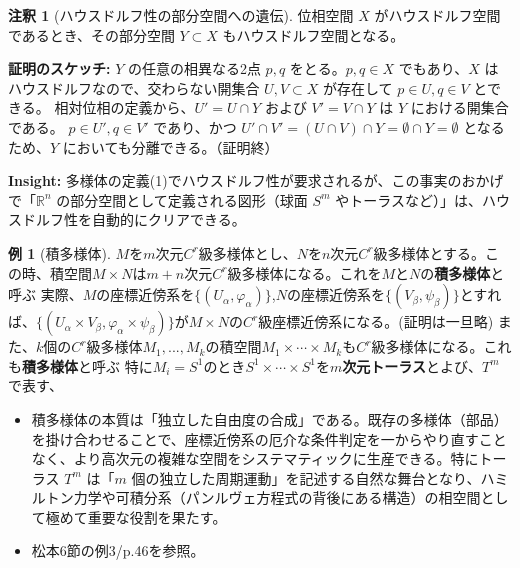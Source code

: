 \documentclass[paper=a4, fontsize=11pt]{jlreq} %
\theoremstyle{definition}
\newtheorem{example}[theorem]{例}
\newtheorem{remark}[theorem]{注釈}
\begin{document}
\begin{remark}[ハウスドルフ性の部分空間への遺伝]
    位相空間 $X$ がハウスドルフ空間であるとき、その部分空間 $Y \subset X$ もハウスドルフ空間となる。
    
    \textbf{証明のスケッチ:}
    $Y$ の任意の相異なる2点 $p, q$ をとる。$p, q \in X$ でもあり、$X$ はハウスドルフなので、交わらない開集合 $U, V \subset X$ が存在して $p \in U, q \in V$ とできる。
    相対位相の定義から、$U' = U \cap Y$ および $V' = V \cap Y$ は $Y$ における開集合である。
    $p \in U', q \in V'$ であり、かつ $U' \cap V' = (U \cap V) \cap Y = \emptyset \cap Y = \emptyset$ となるため、$Y$ においても分離できる。（証明終）
    
    \textbf{Insight:} 多様体の定義(1)でハウスドルフ性が要求されるが、この事実のおかげで「$\mathbb{R}^n$ の部分空間として定義される図形（球面 $S^m$ やトーラスなど）」は、ハウスドルフ性を自動的にクリアできる。
\end{remark}

\begin{example}[積多様体]
    $M$を$m$次元$C^{r}$級多様体とし、$N$を$n$次元$C^{r}$級多様体とする。この時、積空間$M\times N$は$m+n$次元$C^{r}$級多様体になる。これを$M$と$N$の\textbf{積多様体}と呼ぶ
    実際、$M$の座標近傍系を$\{(U_{\alpha},\varphi_{\alpha})\}$,$N$の座標近傍系を$\{(V_{\beta},\psi_{\beta})\}$とすれば、$\{(U_{\alpha}\times V_{\beta},\varphi_{\alpha}\times\psi_{\beta})\}$が$M\times N$の$C^{r}$級座標近傍系になる。(証明は一旦略)
    また、$k$個の$C^{r}$級多様体$M_{1},...,M_{k}$の積空間$M_{1}\times\cdots\times M_{k}$も$C^{r}$級多様体になる。これも\textbf{積多様体}と呼ぶ
    特に$M_{i} = S^{1}$のとき$S^{1}\times\cdots\times S^{1}$を\textbf{$m$次元トーラス}とよび、$T^{m}$で表す、
    \begin{itemize}
        \item[\textbf{Insight:}] 積多様体の本質は「独立した自由度の合成」である。既存の多様体（部品）を掛け合わせることで、座標近傍系の厄介な条件判定を一からやり直すことなく、より高次元の複雑な空間をシステマティックに生産できる。特にトーラス $T^m$ は「$m$ 個の独立した周期運動」を記述する自然な舞台となり、ハミルトン力学や可積分系（パンルヴェ方程式の背後にある構造）の相空間として極めて重要な役割を果たす。
        \item[\textbf{Link:}] 松本6節の例3/p.46を参照。
    \end{itemize}
\end{example}
\end{document}
